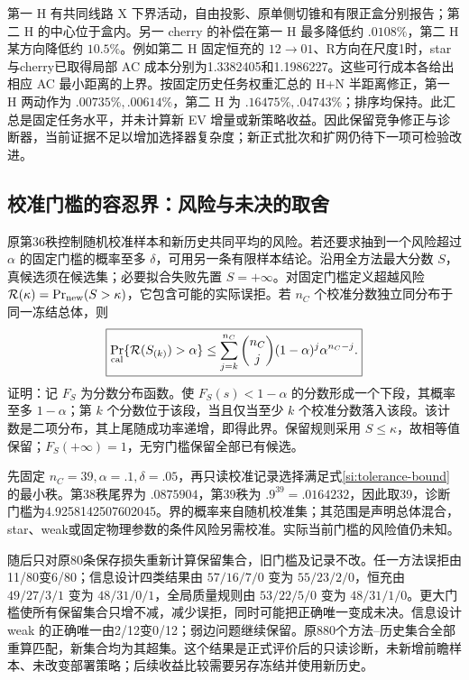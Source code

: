 第一 H 有共同线路 X 下界活动，自由投影、原单侧切锥和有限正盒分别报告；第二 H 的中心位于盒内。另一 cherry 的补偿在第一 H 最多降低约 $.0108\%$，第二 H 某方向降低约 $10.5\%$。例如第二 H 固定恒充的 $12\to01$、R方向在尺度1时，star与cherry已取得局部 AC 成本分别为1.3382405和1.1986227。这些可行成本各给出相应 AC 最小距离的上界。按固定历史任务权重汇总的 H+N 半距离修正，第一 H 两动作为 $.00735\%,.00614\%$，第二 H 为 $.16475\%,.04743\%$；排序均保持。此汇总是固定任务水平，并未计算新 EV 增量或新策略收益。因此保留竞争修正与诊断器，当前证据不足以增加选择器复杂度；新正式批次和扩网仍待下一项可检验改进。

\subsection{校准门槛的容忍界：风险与未决的取舍}
\label{si:tolerance-check}
原第36秩控制随机校准样本和新历史共同平均的风险。若还要求抽到一个风险超过 $\alpha$ 的固定门槛的概率至多 $\delta$，可用另一条有限样本结论。沿用全方法最大分数 $S$，真候选须在候选集；必要拟合失败先置 $S=+\infty$。对固定门槛定义超越风险 $\mathcal R(\kappa)=\Pr_{\rm new}(S>\kappa)$，它包含可能的实际误拒。若 $n_C$ 个校准分数独立同分布于同一冻结总体，则
\begin{equation}
 \boxed{\Pr_{\rm cal}\{\mathcal R(S_{(k)})>\alpha\}
 \le\sum_{j=k}^{n_C}\binom{n_C}{j}(1-\alpha)^j\alpha^{n_C-j}.}
 \label{si:tolerance-bound}
\end{equation}
证明：记 $F_S$ 为分数分布函数。使 $F_S(s)<1-\alpha$ 的分数形成一个下段，其概率至多 $1-\alpha$；第 $k$ 个分数位于该段，当且仅当至少 $k$ 个校准分数落入该段。该计数是二项分布，其上尾随成功率递增，即得此界。保留规则采用 $S\le\kappa$，故相等值保留；$F_S(+\infty)=1$，无穷门槛保留全部已有候选。

先固定 $n_C=39,\alpha=.1,\delta=.05$，再只读校准记录选择满足式\eqref{si:tolerance-bound}的最小秩。第38秩尾界为 $.0875904$，第39秩为 $.9^{39}=.0164232$，因此取39，诊断门槛为4.9258142507602045。界的概率来自随机校准集；其范围是声明总体混合，star、weak或固定物理参数的条件风险另需校准。实际当前门槛的风险值仍未知。

随后只对原80条保存损失重新计算保留集合，旧门槛及记录不改。任一方法误拒由11/80变6/80；信息设计四类结果由 $57/16/7/0$ 变为 $55/23/2/0$，恒充由 $49/27/3/1$ 变为 $48/31/0/1$，全局质量规则由 $53/22/5/0$ 变为 $48/31/1/0$。更大门槛使所有保留集合只增不减，减少误拒，同时可能把正确唯一变成未决。信息设计 weak 的正确唯一由2/12变0/12；弱边问题继续保留。原880个方法--历史集合全部重算匹配，新集合均为其超集。这个结果是正式评价后的只读诊断，未新增前瞻样本、未改变部署策略；后续收益比较需要另存冻结并使用新历史。
